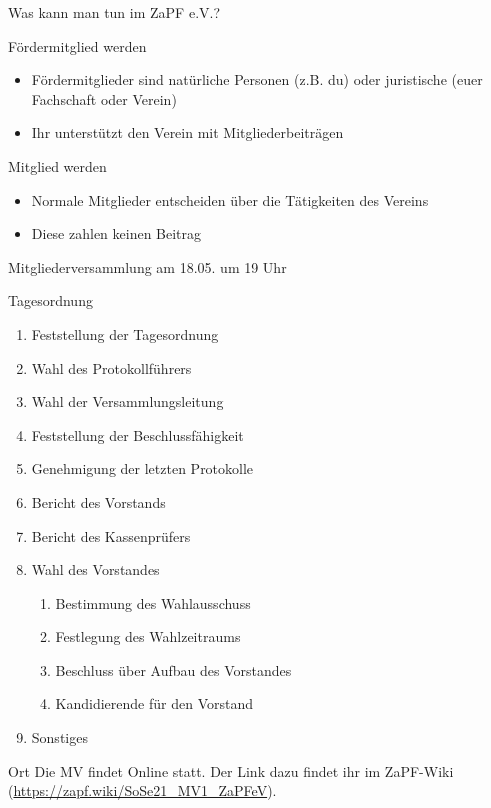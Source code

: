 \documentclass[compress, aspectratio=169]{beamer}
\begin{document}
 \begin{frame}{Was kann man tun im ZaPF e.V.?}
   \begin{block}{Fördermitglied werden}
     \begin{itemize}
     \item Fördermitglieder sind natürliche Personen (z.B. du) oder juristische (euer Fachschaft oder Verein)
     \item Ihr unterstützt den Verein mit Mitgliederbeiträgen
     \end{itemize}
   \end{block}
   \begin{block}{Mitglied werden}
     \begin{itemize}
     \item Normale Mitglieder entscheiden über die Tätigkeiten des Vereins
     \item Diese zahlen keinen Beitrag
     \end{itemize}
   \end{block}
 \end{frame}
   
 \begin{frame}{Mitgliederversammlung am 18.05. um 19 Uhr}
   \begin{block}{Tagesordnung}
     \begin{multicols}{2}
       \begin{enumerate}\small
         \item Feststellung der Tagesordnung
         \item Wahl des Protokollführers
         \item Wahl der Versammlungsleitung
         \item Feststellung der Beschlussfähigkeit
         \item Genehmigung der letzten Protokolle
         \item Bericht des Vorstands
         \item Bericht des Kassenprüfers
     \item Wahl des Vorstandes
     \begin{enumerate}
     \item Bestimmung des Wahlausschuss
     \item Festlegung des Wahlzeitraums
     \item Beschluss über Aufbau des Vorstandes
     \item Kandidierende für den Vorstand
     \end{enumerate}
         \item Sonstiges
       \end{enumerate}
     \end{multicols}
   \end{block}
   \begin{block}{Ort}
     Die MV findet Online statt. Der Link dazu findet ihr im ZaPF-Wiki (\url{https://zapf.wiki/SoSe21_MV1_ZaPFeV}).
   \end{block}
 \end{frame}
 
\end{document}
